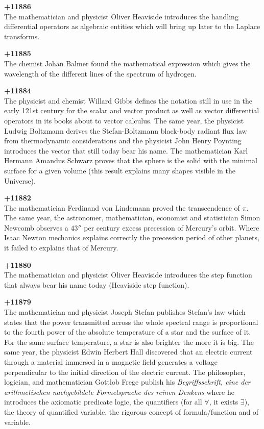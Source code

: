 \textbf{+11886}\\
The mathematician and physicist Oliver Heaviside introduces the handling differential operators as algebraic entities which will bring up later to the Laplace transforms.

\textbf{+11885}\\
The chemist Johan Balmer found the mathematical expression which gives the wavelength of the different lines of the spectrum of hydrogen.

\textbf{+11884}\\
The physicist and chemist Willard Gibbs defines the notation still in use in the early 121st century for the scalar and vector product as well as vector differential operators in its books about to vector calculus. The same year, the physicist Ludwig Boltzmann derives the Stefan-Boltzmann black-body radiant flux law from thermodynamic considerations and the physicist John Henry Poynting introduces the vector that still today bear his name. The mathematician Karl Hermann Amandus Schwarz proves that the sphere is the solid with the minimal surface for a given volume (this result explains many shapes visible in the Universe).

\textbf{+11882}\\
The mathematician Ferdinand von Lindemann proved the transcendence of $\pi$. The same year, the astronomer, mathematician, economist and statistician Simon Newcomb observes a $43''$ per century excess precession of Mercury's orbit. Where Isaac Newton mechanics explains correctly the precession period of other planets, it failed to explains that of Mercury.

\textbf{+11880}\\
The mathematician and physicist Oliver Heaviside introduces the step function that always bear his name today (Heaviside step function).

\textbf{+11879}\\
The mathematician and physicist Joseph Stefan publishes Stefan's law which states that the power transmitted across the whole spectral range is proportional to the fourth power of the absolute temperature of a star and the surface of it. For the same surface temperature, a star is also brighter the more it is big. The same year, the physicist Edwin Herbert Hall discovered that an electric current through a material immersed in a magnetic field generates a voltage perpendicular to the initial direction of the electric current. The philosopher, logician, and mathematician Gottlob Frege publish his \textit{Begriffsschrift, eine der arithmetischen nachgebildete Formelsprache des reinen Denkens} where he introduces the axiomatic predicate logic, the quantifiers (for all $\forall$, it exists $\exists$), the theory of quantified variable, the rigorous concept of formula/function and of variable.

